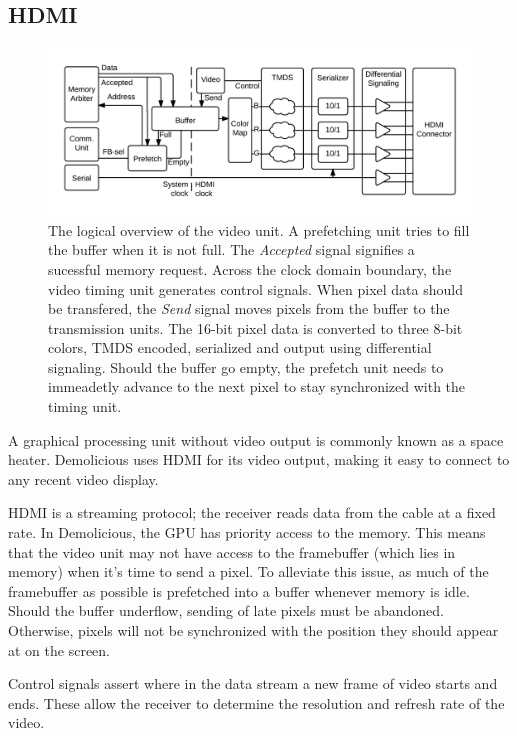 \documentclass[../main/report.tex]{subfiles}
\begin{document}
\subsection{HDMI}
\begin{figure}
	\centering
	\includegraphics[width=\textwidth]{diagrams/HDMI_overview.png}
	\caption{
		The logical overview of the video unit.
		A prefetching unit tries to fill the buffer when it is not full.
		The \emph{Accepted} signal signifies a sucessful memory request.
		Across the clock domain boundary, the video timing unit generates control signals.
		When pixel data should be transfered, the \emph{Send} signal moves pixels from the buffer to the transmission units.
		The 16-bit pixel data is converted to three 8-bit colors, TMDS encoded, serialized and output using differential signaling.
		Should the buffer go empty, the prefetch unit needs to immeadetly advance to the next pixel to stay synchronized with the timing unit.
	}
	\label{fig:video_unit}
\end{figure}
A graphical processing unit without video output is commonly known as a space heater.
Demolicious uses HDMI for its video output, making it easy to connect to any recent video display.

HDMI is a streaming protocol; the receiver reads data from the cable at a fixed rate.
In Demolicious, the GPU has priority access to the memory.
This means that the video unit may not have access to the framebuffer (which lies in memory) when it's time to send a pixel.
To alleviate this issue, as much of the framebuffer as possible is prefetched into a buffer whenever memory is idle.
Should the buffer underflow, sending of late pixels must be abandoned.
Otherwise, pixels will not be synchronized with the position they should appear at on the screen.

Control signals assert where in the data stream a new frame of video starts and ends.
These allow the receiver to determine the resolution and refresh rate of the video.
\end{document}
